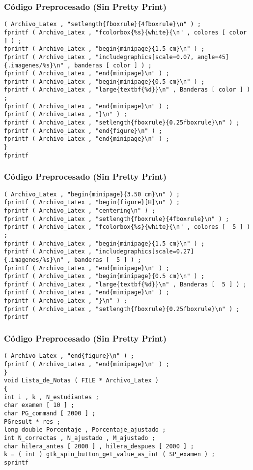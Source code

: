 \documentclass{beamer}
\begin{document}
\begin{frame}[fragile]
\frametitle{C\'odigo Preprocesado (Sin Pretty Print)}
\begin{lstlisting}[style=CStyle]
( Archivo_Latex , "setlength{fboxrule}{4fboxrule}\n" ) ; 
fprintf ( Archivo_Latex , "fcolorbox{%s}{white}{\n" , colores [ color ] ) ; 
fprintf ( Archivo_Latex , "begin{minipage}{1.5 cm}\n" ) ; 
fprintf ( Archivo_Latex , "includegraphics[scale=0.07, angle=45]{.imagenes/%s}\n" , banderas [ color ] ) ; 
fprintf ( Archivo_Latex , "end{minipage}\n" ) ; 
fprintf ( Archivo_Latex , "begin{minipage}{0.5 cm}\n" ) ; 
fprintf ( Archivo_Latex , "large{textbf{%d}}\n" , Banderas [ color ] ) ; 
fprintf ( Archivo_Latex , "end{minipage}\n" ) ; 
fprintf ( Archivo_Latex , "}\n" ) ; 
fprintf ( Archivo_Latex , "setlength{fboxrule}{0.25fboxrule}\n" ) ; 
fprintf ( Archivo_Latex , "end{figure}\n" ) ; 
fprintf ( Archivo_Latex , "end{minipage}\n" ) ; 
} 
fprintf \end{lstlisting}
\end{frame}
\begin{frame}[fragile]
\frametitle{C\'odigo Preprocesado (Sin Pretty Print)}
\begin{lstlisting}[style=CStyle]
( Archivo_Latex , "begin{minipage}{3.50 cm}\n" ) ; 
fprintf ( Archivo_Latex , "begin{figure}[H]\n" ) ; 
fprintf ( Archivo_Latex , "centering\n" ) ; 
fprintf ( Archivo_Latex , "setlength{fboxrule}{4fboxrule}\n" ) ; 
fprintf ( Archivo_Latex , "fcolorbox{%s}{white}{\n" , colores [  5 ] ) ; 
fprintf ( Archivo_Latex , "begin{minipage}{1.5 cm}\n" ) ; 
fprintf ( Archivo_Latex , "includegraphics[scale=0.27]{.imagenes/%s}\n" , banderas [  5 ] ) ; 
fprintf ( Archivo_Latex , "end{minipage}\n" ) ; 
fprintf ( Archivo_Latex , "begin{minipage}{0.5 cm}\n" ) ; 
fprintf ( Archivo_Latex , "large{textbf{%d}}\n" , Banderas [  5 ] ) ; 
fprintf ( Archivo_Latex , "end{minipage}\n" ) ; 
fprintf ( Archivo_Latex , "}\n" ) ; 
fprintf ( Archivo_Latex , "setlength{fboxrule}{0.25fboxrule}\n" ) ; 
fprintf \end{lstlisting}
\end{frame}
\begin{frame}[fragile]
\frametitle{C\'odigo Preprocesado (Sin Pretty Print)}
\begin{lstlisting}[style=CStyle]
( Archivo_Latex , "end{figure}\n" ) ; 
fprintf ( Archivo_Latex , "end{minipage}\n" ) ; 
} 
void Lista_de_Notas ( FILE * Archivo_Latex ) 
{ 
int i , k , N_estudiantes ; 
char examen [ 10 ] ; 
char PG_command [ 2000 ] ; 
PGresult * res ; 
long double Porcentaje , Porcentaje_ajustado ; 
int N_correctas , N_ajustado , M_ajustado ; 
char hilera_antes [ 2000 ] , hilera_despues [ 2000 ] ; 
k = ( int ) gtk_spin_button_get_value_as_int ( SP_examen ) ; 
sprintf \end{lstlisting}
\end{frame}
\end{document}

